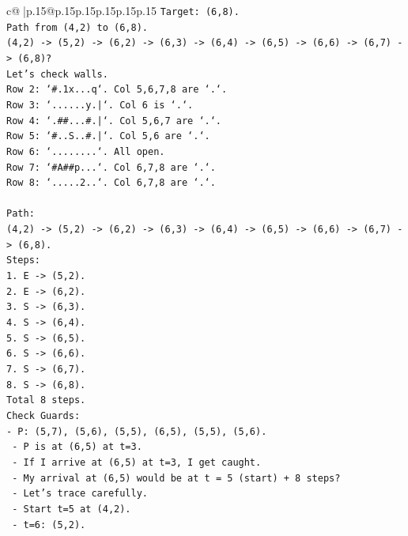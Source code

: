 \documentclass{article}
\begin{document}
{\begin{supertabular}{c@{$\;$}|p{.15\linewidth}@{}p{.15\linewidth}p{.15\linewidth}p{.15\linewidth}p{.15\linewidth}p{.15\linewidth}}
{{{\texttt{Target: (6,8).} \\
\texttt{Path from (4,2) to (6,8).} \\
\texttt{(4,2) {-}> (5,2) {-}> (6,2) {-}> (6,3) {-}> (6,4) {-}> (6,5) {-}> (6,6) {-}> (6,7) {-}> (6,8)?} \\
\texttt{Let's check walls.} \\
\texttt{Row 2: `\#.1x...q`. Col 5,6,7,8 are `.`.} \\
\texttt{Row 3: `......y.|`. Col 6 is `.`.} \\
\texttt{Row 4: `.\#\#...\#.|`. Col 5,6,7 are `.`.} \\
\texttt{Row 5: `\#..S..\#.|`. Col 5,6 are `.`.} \\
\texttt{Row 6: `........`. All open.} \\
\texttt{Row 7: `\#A\#\#p...`. Col 6,7,8 are `.`.} \\
\texttt{Row 8: `.....2..`. Col 6,7,8 are `.`.} \\
\\ 
\texttt{Path:} \\
\texttt{(4,2) {-}> (5,2) {-}> (6,2) {-}> (6,3) {-}> (6,4) {-}> (6,5) {-}> (6,6) {-}> (6,7) {-}> (6,8).} \\
\texttt{Steps:} \\
\texttt{1. E {-}> (5,2).} \\
\texttt{2. E {-}> (6,2).} \\
\texttt{3. S {-}> (6,3).} \\
\texttt{4. S {-}> (6,4).} \\
\texttt{5. S {-}> (6,5).} \\
\texttt{6. S {-}> (6,6).} \\
\texttt{7. S {-}> (6,7).} \\
\texttt{8. S {-}> (6,8).} \\
\texttt{Total 8 steps.} \\
\texttt{Check Guards:} \\
\texttt{{-} P: (5,7), (5,6), (5,5), (6,5), (5,5), (5,6).} \\
\texttt{  {-} P is at (6,5) at t=3.} \\
\texttt{  {-} If I arrive at (6,5) at t=3, I get caught.} \\
\texttt{  {-} My arrival at (6,5) would be at t = 5 (start) + 8 steps?} \\
\texttt{  {-} Let's trace carefully.} \\
\texttt{  {-} Start t=5 at (4,2).} \\
\texttt{  {-} t=6: (5,2).} \\
}}}
\end{supertabular}}
\end{document}

